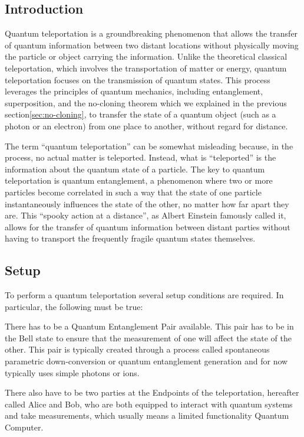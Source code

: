 \subsection{Introduction}\label{subsec:introduction}
Quantum teleportation is a groundbreaking phenomenon that allows the transfer of quantum information
between two distant locations without physically moving the particle or object carrying the information.
Unlike the theoretical classical teleportation, which involves the transportation of matter or energy,
quantum teleportation focuses on the transmission of quantum states.
This process leverages the principles of quantum mechanics, including entanglement, superposition,
and the no-cloning theorem which we explained in the previous section\ref{sec:no-cloning},
to transfer the state of a quantum object (such as a photon or an electron) from one place to another,
without regard for distance.

The term ``quantum teleportation'' can be somewhat misleading because, in the process, no actual matter is teleported.
Instead, what is ``teleported'' is the information about the quantum state of a particle.
The key to quantum teleportation is quantum entanglement,
a phenomenon where two or more particles become correlated in such a way that the state of one particle instantaneously
influences the state of the other, no matter how far apart they are.
This ``spooky action at a distance'', as Albert Einstein famously called it,
allows for the transfer of quantum information between distant parties without having to transport the frequently fragile
quantum states themselves.

\subsection{Setup}\label{subsec:setup}
To perform a quantum teleportation several setup conditions are required.
In particular, the following must be true:

There has to be a Quantum Entanglement Pair available.
This pair has to be in the Bell state\cite{explain_bell_state} to ensure that the measurement of one will affect the state of the other.
This pair is typically created through a process called
spontaneous parametric down-conversion\cite{something} or quantum entanglement generation\cite{something} and for now
typically uses simple photons or ions.

There also have to be two parties at the Endpoints of the teleportation, hereafter called Alice and Bob, who are both
equipped to interact with quantum systems and take measurements, which usually means a limited functionality
Quantum Computer.

